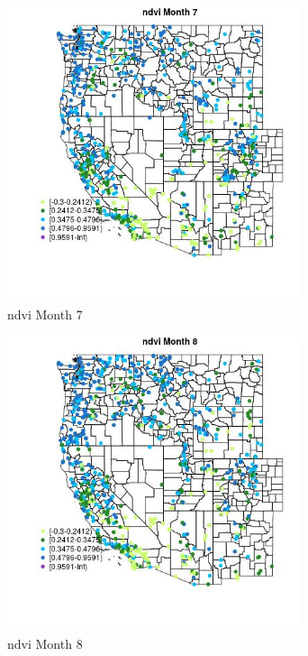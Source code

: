 \begin{figure} 
\centering  
\includegraphics[width=0.77\textwidth]{Code_Outputs/Report_ML_input_PM25_Step4_part_e_de_duplicated_aves_compiled_2019-05-21wNAs_MapObsMo7ndvi.jpg} 
\caption{\label{fig:Report_ML_input_PM25_Step4_part_e_de_duplicated_aves_compiled_2019-05-21wNAsMapObsMo7ndvi}ndvi Month 7} 
\end{figure} 
 

\begin{figure} 
\centering  
\includegraphics[width=0.77\textwidth]{Code_Outputs/Report_ML_input_PM25_Step4_part_e_de_duplicated_aves_compiled_2019-05-21wNAs_MapObsMo8ndvi.jpg} 
\caption{\label{fig:Report_ML_input_PM25_Step4_part_e_de_duplicated_aves_compiled_2019-05-21wNAsMapObsMo8ndvi}ndvi Month 8} 
\end{figure} 
 

